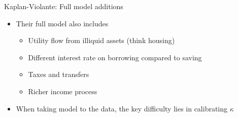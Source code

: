 \documentclass[9pt]{beamer}
\newcommand{\bit}{\begin{itemize}}
\newcommand{\eit}{\end{itemize}}
\begin{document}
\begin{frame}{Kaplan-Violante: Full model additions}

\bit
\setlength\itemsep{1em}

\item Their full model also includes
\bit
	\item Utility flow from illiquid assets (think housing)
	\item Different interest rate on borrowing compared to saving
	\item Taxes and transfers
	\item Richer income process
\eit

\item When taking model to the data, the key difficulty lies in calibrating $\kappa$

\eit

\end{frame}

%
%
%
%
%
%
\end{document}
